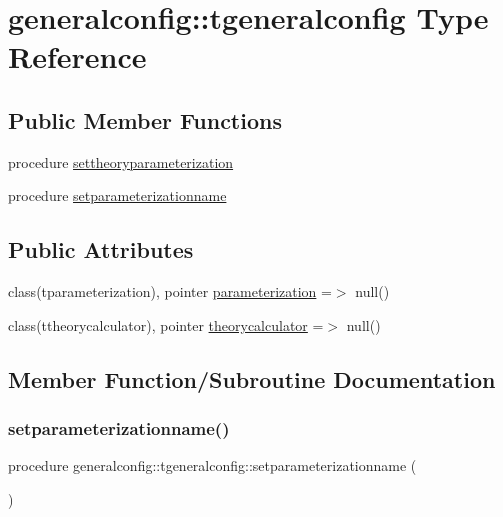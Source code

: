 \hypertarget{structgeneralconfig_1_1tgeneralconfig}{}\section{generalconfig\+:\+:tgeneralconfig Type Reference}
\label{structgeneralconfig_1_1tgeneralconfig}
\subsection*{Public Member Functions}
\begin{DoxyCompactItemize}
\item 
procedure \mbox{\hyperlink{structgeneralconfig_1_1tgeneralconfig_a4ce25aa4fd705c435c57d171e247902c}{settheoryparameterization}}
\item 
procedure \mbox{\hyperlink{structgeneralconfig_1_1tgeneralconfig_ad283abd37c47a6a83648a4aec598b206}{setparameterizationname}}
\end{DoxyCompactItemize}
\subsection*{Public Attributes}
\begin{DoxyCompactItemize}
\item 
class(tparameterization), pointer \mbox{\hyperlink{structgeneralconfig_1_1tgeneralconfig_ade4cc200c0573e820d7656b740f9833c}{parameterization}} =$>$ null()
\item 
class(ttheorycalculator), pointer \mbox{\hyperlink{structgeneralconfig_1_1tgeneralconfig_a1f1595e5d3315eaf5835cae4c3d3601d}{theorycalculator}} =$>$ null()
\end{DoxyCompactItemize}


\subsection{Member Function/\+Subroutine Documentation}
\mbox{\label{structgeneralconfig_1_1tgeneralconfig_ad283abd37c47a6a83648a4aec598b206}} 
\subsubsection{\texorpdfstring{setparameterizationname()}{setparameterizationname()}}
{\footnotesize\ttfamily procedure generalconfig\+::tgeneralconfig\+::setparameterizationname (\begin{DoxyParamCaption}{ }\end{DoxyParamCaption})}

